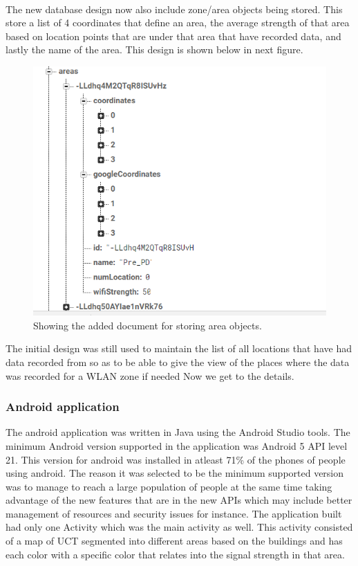 \paragraph{}The new database design now also include zone/area objects being stored. This store a list of 4 coordinates that define an area,  the average strength of that area based on location points that are under that area that have recorded data, and lastly the name of the area. This design is shown below in next figure.
\begin{figure}
	\centering
	\includegraphics[width=0.7\linewidth]{images/2nd_db}
	\caption[]{Showing the added document for storing area objects.}
\end{figure}
The initial design was still used to maintain the list of all locations that have had data recorded from so as to be able to give the view of the places where the data was recorded for a WLAN zone if needed
Now we get to the details. 

\subsubsection*{Android application}
The android application was written in Java using the Android Studio tools. The minimum Android version supported in the application was Android 5 API level 21. This version for android was installed in atleast 71\% of the phones of people using android. The reason it was selected to be the minimum supported version was to manage to reach a large population of people at the same time taking advantage of the new features that are in the new APIs which may include better management of resources and security issues for instance. The application built had only one Activity which was the main activity as well. This activity consisted of a map of UCT segmented into different areas based on the buildings and has each color with a specific color that relates into the signal strength in that area. 

